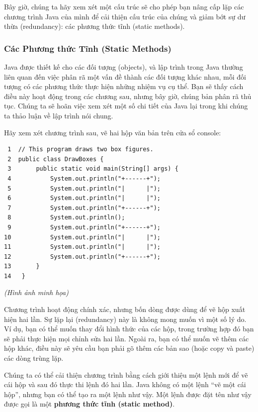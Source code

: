 Bây giờ, chúng ta hãy xem xét một cấu trúc sẽ cho phép bạn nâng cấp lặp
các chương trình Java của mình để cải thiện cấu trúc của chúng và giảm
bớt sự dư thừa (redundancy): các phương thức tĩnh (static methods).

\subsubsection{Các Phương thức Tĩnh (Static
Methods)}\label{cuxe1c-phux1b0ux1a1ng-thux1ee9c-tux129nh-static-methods}

Java được thiết kế cho các đối tượng (objects), và lập trình trong Java
thường liên quan đến việc phân rã một vấn đề thành các đối tượng khác
nhau, mỗi đối tượng có các phương thức thực hiện những nhiệm vụ cụ thể.
Bạn sẽ thấy cách điều này hoạt động trong các chương sau, nhưng bây giờ,
chúng bản phân rã thủ tục. Chúng ta sẽ hoãn việc xem xét một số chi tiết
của Java lại trong khi chúng ta thảo luận về lập trình nói chung.

Hãy xem xét chương trình sau, vẽ hai hộp văn bản trên cửa sổ console:

\begin{verbatim}
 1  // This program draws two box figures.
 2  public class DrawBoxes {
 3       public static void main(String[] args) {
 4           System.out.println("+------+");
 5           System.out.println("|      |");
 6           System.out.println("|      |");
 7           System.out.println("+------+");
 8           System.out.println();
 9           System.out.println("+------+");
10           System.out.println("|      |");
11           System.out.println("|      |");
12           System.out.println("+------+");
13       }
14   }
\end{verbatim}

\emph{(Hình ảnh minh họa)}

Chương trình hoạt động chính xác, nhưng bốn dòng được dùng để vẽ hộp
xuất hiện hai lần. Sự lặp lại (redundancy) này là không mong muốn vì một
số lý do. Ví dụ, bạn có thể muốn thay đổi hình thức của các hộp, trong
trường hợp đó bạn sẽ phải thực hiện mọi chỉnh sửa hai lần. Ngoài ra, bạn
có thể muốn vẽ thêm các hộp khác, điều này sẽ yêu cầu bạn phải gõ thêm
các bản sao (hoặc copy và paste) các dòng trùng lặp.

Chúng ta có thể cải thiện chương trình bằng cách giới thiệu một lệnh mới
để vẽ cái hộp và sau đó thực thi lệnh đó hai lần. Java không có một lệnh
``vẽ một cái hộp'', nhưng bạn có thể tạo ra một lệnh như vậy. Một lệnh
được đặt tên như vậy được gọi là một \textbf{phương thức tĩnh (static
method)}.

